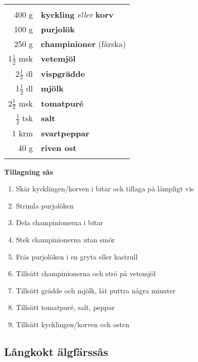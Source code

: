 \begin{table}[H]
	\begin{tabular}{rl}
	\hline
	&\\
		400 g & \textbf{kyckling} \textit{eller} \textbf{korv}\\
		100 g & \textbf{purjolök}\\
		250 g & \textbf{champinioner} (färska)\\
		1$\frac{1}{2}$ msk & \textbf{vetemjöl}\\
		2$\frac{1}{2}$ dl & \textbf{vispgrädde}\\
		1$\frac{1}{2}$ dl & \textbf{mjölk}\\
		2$\frac{1}{2}$ msk & \textbf{tomatpuré}\\
		$\frac{1}{2}$ tsk & \textbf{salt}\\
		1 krm & \textbf{svartpeppar}\\
		40 g & \textbf{riven ost}\\
	&\\
	\hline
	\end{tabular}
\end{table}


\begin{multicols*}{2}

\noindent \textbf{Tillagning sås}
\begin{enumerate}
	\itemsep0cm
	\item Skär kycklingen/korven i bitar och tillaga på lämpligt vis
	\item Strimla purjolöken
	\item Dela champinionerna i bitar
	\item Stek champinionerna utan smör
	\item Fräs purjolöken i en gryta eller kastrull
	\item Tillsätt champinionerna och strö på vetemjöl
	\item Tillsätt grädde och mjölk, låt puttra några minuter
	\item Tillsätt tomatpuré, salt, peppar
	\item Tillsätt kycklingen/korven och osten
\end{enumerate}

\end{multicols*}

\clearpage

\subsection{Långkokt älgfärssås}

